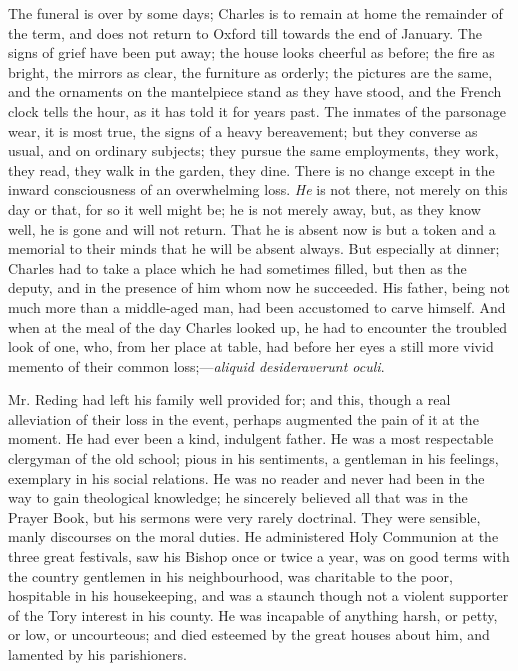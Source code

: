 The funeral is over by some days; Charles is to remain at home the
remainder of the term, and does not return to Oxford till towards the
end of January. The signs of grief have been put away; the house looks
cheerful as before; the fire as bright, the mirrors as clear,
the furniture as orderly; the pictures are the same, and the ornaments
on the mantelpiece stand as they have stood, and the French clock
tells the hour, as it has told it for years past. The inmates of the
parsonage wear, it is most true, the signs of a heavy bereavement; but
they converse as usual, and on ordinary subjects; they pursue the same
employments, they work, they read, they walk in the garden, they dine.
There is no change except in the inward consciousness of an
overwhelming loss. \emph{He} is not there, not merely on this day or
that, for so it well might be; he is not merely away, but, as they
know well, he is gone and will not return. That he is absent now is
but a token and a memorial to their minds that he will be absent
always. But especially at dinner; Charles had to take a place which he
had sometimes filled, but then as the deputy, and in the presence of
him whom now he succeeded. His father, being not much more than a
middle-aged man, had been accustomed to carve himself. And when at the
meal of the day Charles looked up, he had to encounter the troubled
look of one, who, from her place at table, had before her eyes a still
more vivid memento of their common loss;—\emph{aliquid desideraverunt
oculi}.

Mr. Reding had left his family well provided for; and this, though
a real alleviation of their loss in the event, perhaps augmented the
pain of it at the moment. He had ever been a kind, indulgent father.
He was a most respectable clergyman of the old school; pious in his
sentiments, a gentleman in his feelings, exemplary in his social
relations. He was no reader and never had been in the way to
gain theological knowledge; he sincerely believed all that was in the
Prayer Book, but his sermons were very rarely doctrinal. They were
sensible, manly discourses on the moral duties. He administered Holy
Communion at the three great festivals, saw his Bishop once or twice a
year, was on good terms with the country gentlemen in his
neighbourhood, was charitable to the poor, hospitable in his
housekeeping, and was a staunch though not a violent supporter of the
Tory interest in his county. He was incapable of anything harsh, or
petty, or low, or uncourteous; and died esteemed by the great houses
about him, and lamented by his parishioners.

